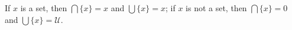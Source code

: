 If $x$ is a set, then $\bigcap \{x\} = x$ and $\bigcup \{x\} = x$; if $x$ is not a set, then $\bigcap \{x\} = 0$ and $\bigcup \{x\} = \mathcal{U}$.

